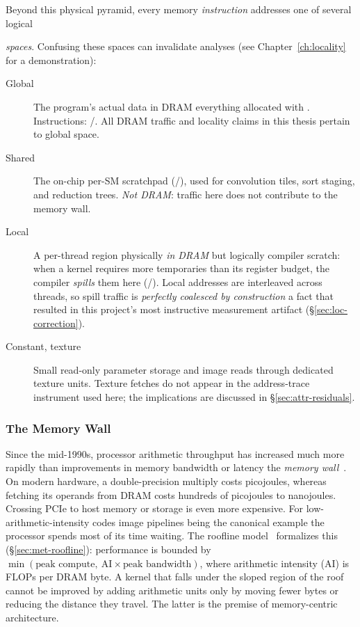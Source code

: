 Beyond this physical pyramid, every memory \emph{instruction} addresses one of several logical

\emph{spaces}. Confusing these spaces can invalidate analyses (see Chapter~\ref{ch:locality} for a demonstration):

\begin{description}
\item[Global] The program's actual data in DRAM everything allocated with . Instructions: /. All DRAM traffic and locality claims in this thesis pertain to global space.

\item[Shared] The on-chip per-SM scratchpad (/), used for convolution tiles, sort staging, and reduction trees. \emph{Not DRAM}: traffic here does not contribute to the memory wall.

\item[Local] A per-thread region physically \emph{in DRAM} but logically compiler scratch: when a kernel requires more temporaries than its register budget, the compiler \emph{spills} them here (/). Local addresses are interleaved across threads, so spill traffic is \emph{perfectly coalesced by construction} a fact that resulted in this project's most instructive measurement artifact (\S\ref{sec:loc-correction}).

\item[Constant, texture] Small read-only parameter storage and image reads through dedicated texture units. Texture fetches do not appear in the address-trace instrument used here; the implications are 
discussed in \S\ref{sec:attr-residuals}.
\end{description}

\subsubsection{The Memory Wall}
\label{sec:bg-wall}

Since the mid-1990s, processor arithmetic throughput has increased much more rapidly than improvements in memory bandwidth or latency the \emph{memory wall}~\cite{wulf1995memorywall}. On modern hardware, a double-precision multiply costs picojoules, whereas fetching its operands from DRAM costs hundreds of picojoules to nanojoules. Crossing PCIe to host memory or storage is even more expensive. For low-arithmetic-intensity codes image pipelines being the canonical example the processor spends most of its time waiting. The roofline model~\cite{williams2009roofline} formalizes this (\S\ref{sec:met-roofline}): performance is bounded by $\min(\text{peak compute},\ \text{AI}\times\text{peak bandwidth})$, where arithmetic intensity (AI) is FLOPs per DRAM byte. A kernel that falls under the sloped region of the roof cannot be improved by adding arithmetic units only by moving fewer bytes or reducing the distance they travel. The latter is the premise of memory-centric architecture.

